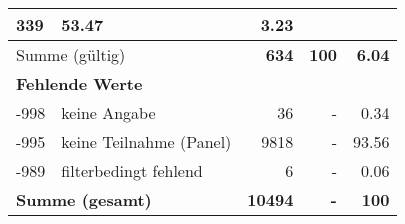 \begin{longtable}{lXrrr}
       \num{339} &
       \num[round-mode=places,round-precision=2]{53.47} &
         \num[round-mode=places,round-precision=2]{3.23} \\
     \midrule
     \multicolumn{2}{l}{Summe (gültig)} &
       \textbf{\num{634}} &
     \textbf{\num{100}} &
       \textbf{\num[round-mode=places,round-precision=2]{6.04}} \\
     \multicolumn{5}{l}{\textbf{Fehlende Werte}}\\
       -998 &
       keine Angabe &
         \num{36} &
        - &
         \num[round-mode=places,round-precision=2]{0.34} \\
       -995 &
       keine Teilnahme (Panel) &
         \num{9818} &
        - &
         \num[round-mode=places,round-precision=2]{93.56} \\
       -989 &
       filterbedingt fehlend &
         \num{6} &
        - &
         \num[round-mode=places,round-precision=2]{0.06} \\
     \midrule
     \multicolumn{2}{l}{\textbf{Summe (gesamt)}} &
          \textbf{\num{10494}} &
        \textbf{-} &
        \textbf{\num{100}} \\
     \bottomrule
     \end{longtable}
     
